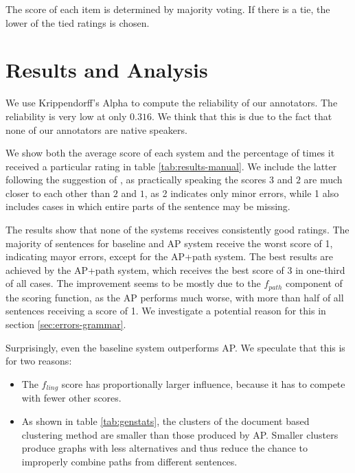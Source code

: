 \documentclass[a4paper,BCOR=10mm]{report}
\numberwithin{lemma}{chapter}
\numberwithin{definition}{chapter}
\begin{document}
The score of each item is determined by majority voting. If there is a tie, the lower of the tied ratings is chosen.

\section{Results and Analysis}

We use Krippendorff's Alpha \citep{krippendorff} to compute the reliability of our annotators.
The reliability is very low at only $0.316$. We think that this is due to the fact that none of our annotators are native speakers.

We show both the average score of each system and the percentage of times it received a particular rating in table \ref{tab:results-manual}.
We include the latter following the suggestion of \citet{filippova}, as practically speaking the scores $3$ and $2$ are much closer to each other than $2$ and $1$, as 2 indicates only minor errors, while 1 also includes cases in which entire parts of the sentence may be missing.

The results show that none of the systems receives consistently good ratings. The majority of sentences for baseline and AP system receive the worst score of 1, indicating mayor errors, except for the AP+path system.
The best results are achieved by the AP+path system, which receives the best score of 3 in one-third of all cases. The improvement seems to be mostly due to the $f_{path}$ component of the scoring function, as the AP performs much worse, with more than half of all sentences receiving a score of 1.
We investigate a potential reason for this in section \ref{sec:errors-grammar}.

Surprisingly, even the baseline system outperforms AP. We speculate that this is for two reasons:

\begin{itemize}
    \item{The $f_{ling}$ score has proportionally larger influence, because it has to compete with fewer other scores.}
    \item{As shown in table \ref{tab:genstats}, the clusters of the document based clustering method are smaller than those produced by AP. Smaller clusters produce graphs with less alternatives and thus reduce the chance to improperly combine paths from different sentences.}
\end{itemize}
\end{document}
